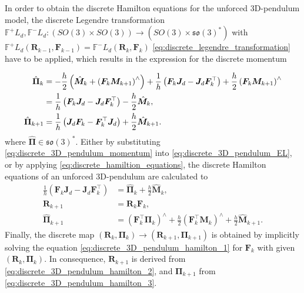 In order to obtain the discrete Hamilton equations for the unforced 3D-pendulum model, the discrete Legendre transformation $\mathbb{F}^+L_d, \mathbb{F}^-L_d:(SO(3)\times SO(3)) \to (SO(3) \times \mathfrak{so}(3)^*)$ with $\mathbb{F}^+L_d(\bm{R}_{k-1}, \bm{F}_{k-1}) = \mathbb{F}^-L_d(\bm{R}_k, \bm{F}_k)$ \eqref{eq:discrete_legendre_transformation} have to be applied, which results in the expression for the discrete momentum

\begin{subequations}\label{eq:discrete_3D_pendulum_momentum}
\begin{align}
    \hat{\bm{\Pi}}_k
    &=
    -\frac{h}{2}\left(
        \hat{\bm{M}}_k
        + \left(\bm{F}_k\bm{M}_{k+1}\right)^\wedge
    \right)
    +
    \frac{1}{h}\left(
        \bm{F}_k\bm{J}_d
        - \bm{J}_d\bm{F}_k^{\top}
    \right)
    +
    \frac{h}{2}\left(\bm{F}_k\bm{M}_{k+1}\right)^\wedge
    \notag \\
    &=
    \frac{1}{h}\left(
        \bm{F}_k\bm{J}_d
        - \bm{J}_d\bm{F}_k^{\top}
    \right)
    - \frac{h}{2}\hat{\bm{M}}_k, \label{eq:discrete_3D_pendulum_momentum_1} \\
    \hat{\bm{\Pi}}_{k+1}
    &=
    \frac{1}{h}\left(
        \bm{J}_d\bm{F}_k
        - \bm{F}_k^{\top}\bm{J}_d
    \right)
    + \frac{h}{2}\hat{\bm{M}}_{k+1}.\label{eq:discrete_3D_pendulum_momentum_2}
\end{align}
\end{subequations}
where $ \hat{\bm{\Pi}} \in \mathfrak{so}(3)^*$. Either by substituting \eqref{eq:discrete_3D_pendulum_momentum} into \eqref{eq:discrete_3D_pendulum_EL}, or by applying \eqref{eq:discrete_hamiltion_equations}, the discrete Hamilton equations of an unforced 3D-pendulum are calculated to
\begin{subequations}\label{eq:discrete_3D_pendulum_hamilton}
\begin{align}
    \label{eq:discrete_3D_pendulum_hamilton_1}
     \frac{1}{h}\left(
        \bm{F}_k \bm{J}_d
        - \bm{J}_d \bm{F}_k^{\top}
    \right)
    &=
    \hat{\bm{\Pi}}_k
    + \frac{h}{2}\hat{\bm{M}}_k ,\\
    \label{eq:discrete_3D_pendulum_hamilton_2}
    \bm{R}_{k+1}
    &=
    \bm{R}_k \bm{F}_k ,\\
    \label{eq:discrete_3D_pendulum_hamilton_3}
    \hat{\bm{\Pi}}_{k+1}
    &=
    (\bm{F}_k^\top \bm{\Pi}_k)^\wedge
    + \frac{h}{2}(\bm{F}_k^\top \bm{M}_k)^\wedge
    + \frac{h}{2}\hat{\bm{M}}_{k+1}.
\end{align}
\end{subequations}
Finally, the discrete map $(\bm{R}_k, \bm{\Pi}_k)  \to (\bm{R}_{k+1}, \bm{\Pi}_{k+1})$ is obtained by implicitly solving the equation \eqref{eq:discrete_3D_pendulum_hamilton_1} for $\bm{F}_k$ with given $(\bm{R}_k, \bm{\Pi}_k)$. In consequence, $\bm{R}_{k+1}$ is derived from \eqref{eq:discrete_3D_pendulum_hamilton_2}, and $\bm{\Pi}_{k+1}$ from \eqref{eq:discrete_3D_pendulum_hamilton_3}.

